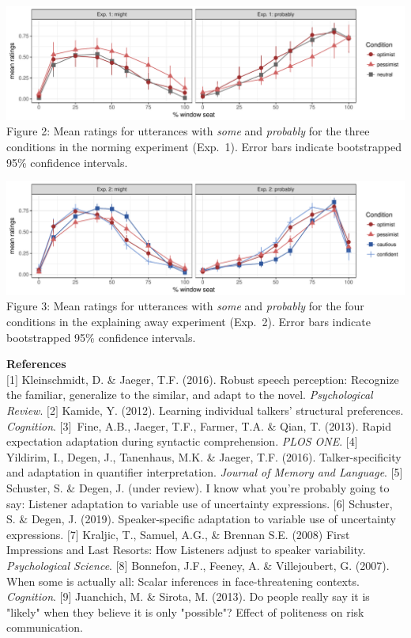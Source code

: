 \documentclass[11pt]{article}
\begin{document}
\vspace{0.4em}
\includegraphics[width=\textwidth]{./plots/norming.pdf}\\
{\small Figure 2: Mean ratings for utterances with \textit{some} and \textit{probably} for the three conditions in the norming experiment (Exp.~1). Error bars indicate bootstrapped 95\% confidence intervals.}

\vspace{0.4em}
\includegraphics[width=\textwidth]{./plots/exp.pdf}\\
{\small Figure 3: Mean ratings for utterances with \textit{some} and \textit{probably} for the four conditions in the explaining away experiment (Exp.~2). Error bars indicate bootstrapped 95\% confidence intervals. }

\vspace{1em}
\noindent \textbf{References} \\
{\tiny \noindent $[$1$]$ Kleinschmidt, D. \& Jaeger, T.F. (2016). Robust speech perception: Recognize the familiar, generalize to the similar, and adapt to the novel. \textit{Psychological Review}. $[$2$]$ Kamide, Y. (2012). Learning individual talkers' structural preferences. \textit{Cognition}. $[$3$]$~Fine, A.B., Jaeger, T.F., Farmer, T.A. \& Qian, T. (2013). Rapid expectation adaptation during syntactic comprehension. \textit{PLOS ONE}. $[$4$]$ Yildirim, I., Degen, J., Tanenhaus, M.K. \& Jaeger, T.F. (2016). Talker-specificity and adaptation in quantifier interpretation. \textit{Journal of Memory and Language}. $[$5$]$  Schuster, S. \& Degen, J. (under review). I know what you're probably going to say: Listener adaptation to variable use of uncertainty expressions. $[$6$]$  Schuster, S. \& Degen, J. (2019). Speaker-specific adaptation to variable use of uncertainty expressions. $[$7$]$  Kraljic, T., Samuel, A.G., \& Brennan S.E. (2008) First Impressions and Last Resorts: How Listeners adjust to speaker variability. \textit{Psychological Science}. $[$8$]$   Bonnefon, J.F., Feeney, A. \& Villejoubert, G. (2007). When some is actually all: Scalar inferences in face-threatening contexts. \textit{Cognition}. $[$9$]$  Juanchich, M. \& Sirota, M. (2013). Do people really say it is "likely" when they believe it is only "possible"? Effect of politeness on risk communication.
}
\end{document}
